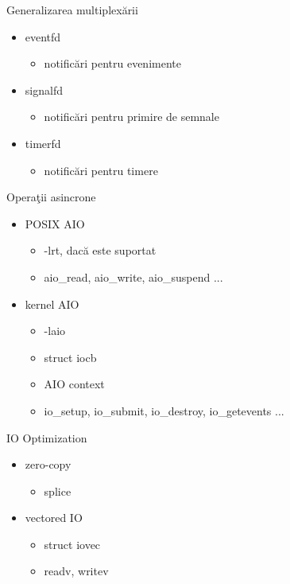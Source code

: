 \documentclass{so.cs.pub.ro}
\begin{document}
\begin{frame}{Generalizarea multiplexării}
  \begin{itemize}    %
    \item eventfd
      \begin{itemize}
        \item notificări pentru evenimente
      \end{itemize}
    \item signalfd
      \begin{itemize}
        \item notificări pentru primire de semnale
      \end{itemize}
    \item timerfd
      \begin{itemize}
        \item notificări pentru timere
      \end{itemize}
  \end{itemize}
\end{frame}

\begin{frame}{Operaţii asincrone}
  \begin{itemize}    %
    \item POSIX AIO
      \begin{itemize}
        \item -lrt, dacă este suportat
        \item aio_read, aio_write, aio_suspend ...
      \end{itemize}
    \item kernel AIO
      \begin{itemize}
        \item -laio
        \item struct iocb
        \item AIO context
        \item io_setup, io_submit, io_destroy, io_getevents ...
      \end{itemize}
  \end{itemize}
\end{frame}

\begin{frame}{IO Optimization}
  \begin{itemize}
    \item zero-copy
      \begin{itemize}
        \item splice
      \end{itemize}
    \item vectored IO
      \begin{itemize}
        \item struct iovec
        \item readv, writev
      \end{itemize}
  \end{itemize}
\end{frame}
\end{document}
